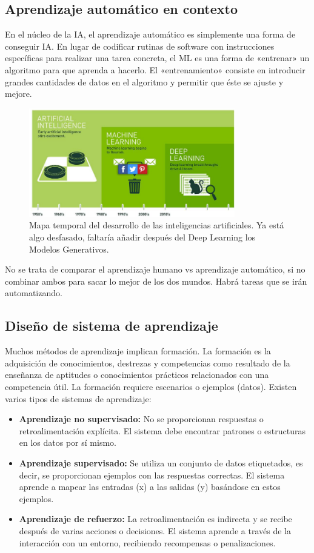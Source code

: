 \subsection{Aprendizaje automático en contexto}
En el núcleo de la IA, el aprendizaje automático es simplemente una forma de conseguir IA. En lugar de codificar rutinas de software con instrucciones específicas para realizar una tarea concreta, el ML es una forma de «entrenar» un algoritmo para que aprenda a hacerlo. El «entrenamiento» consiste en introducir grandes cantidades de datos en el algoritmo y permitir que éste se ajuste y mejore.

\begin{figure}[htbp]
\centering
\includegraphics[width = 0.8\textwidth]{figs/ai-timeline.png}
\caption{Mapa temporal del desarrollo de las inteligencias artificiales. Ya está algo desfasado, faltaría añadir después del Deep Learning los Modelos Generativos.}
\end{figure}

No se trata de comparar el aprendizaje humano vs aprendizaje automático, si no combinar ambos para sacar lo mejor de los dos mundos. Habrá tareas que se irán automatizando.

\subsection{Diseño de sistema de aprendizaje}
Muchos métodos de aprendizaje implican formación. La formación es la adquisición de conocimientos, destrezas y competencias como resultado de la enseñanza de aptitudes o conocimientos prácticos relacionados con una competencia útil. La formación requiere escenarios o ejemplos (datos). Existen varios tipos de sistemas de aprendizaje:
\begin{itemize}
\item \textbf{Aprendizaje no supervisado:} No se proporcionan respuestas o retroalimentación explícita. El sistema debe encontrar patrones o estructuras en los datos por sí mismo.
\item \textbf{Aprendizaje supervisado:} Se utiliza un conjunto de datos etiquetados, es decir, se proporcionan ejemplos con las respuestas correctas. El sistema aprende a mapear las entradas (x) a las salidas (y) basándose en estos ejemplos.
\item \textbf{Aprendizaje de refuerzo:} La retroalimentación es indirecta y se recibe después de varias acciones o decisiones. El sistema aprende a través de la interacción con un entorno, recibiendo recompensas o penalizaciones.
\end{itemize}

